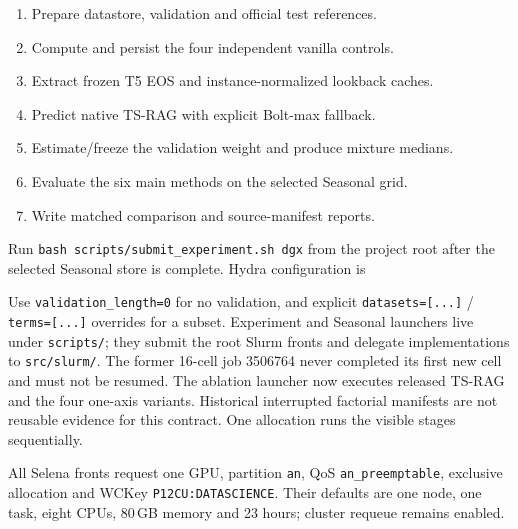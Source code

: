 \documentclass[11pt,a4paper]{article}
\begin{document}
\begin{enumerate}
\item Prepare datastore, validation and official test references.
\item Compute and persist the four independent vanilla controls.
\item Extract frozen T5 EOS and instance-normalized lookback caches.
\item Predict native TS-RAG with explicit Bolt-max fallback.
\item Estimate/freeze the validation weight and produce mixture medians.
\item Evaluate the six main methods on the selected Seasonal grid.
\item Write matched comparison and source-manifest reports.
\end{enumerate}
Run \texttt{bash scripts/submit\_experiment.sh dgx} from the project root after the
selected Seasonal store is complete. Hydra configuration is
\begin{quote}\end{quote}
Use \texttt{validation\_length=0} for no validation, and explicit
\texttt{datasets=[...]} / \texttt{terms=[...]} overrides for a subset.
Experiment and Seasonal launchers live under \texttt{scripts/}; they submit
the root Slurm fronts and delegate implementations to \texttt{src/slurm/}.
The former 16-cell job 3506764 never completed its first new cell and must not
be resumed. The ablation launcher now executes released TS-RAG and the four
one-axis variants. Historical interrupted factorial manifests are not reusable
evidence for this contract.
One allocation runs the visible stages sequentially.

All Selena fronts request one GPU, partition \texttt{an}, QoS
\texttt{an\_preemptable}, exclusive allocation and WCKey
\texttt{P12CU:DATASCIENCE}. Their defaults are one node, one task,
eight CPUs, 80\,GB memory and 23 hours; cluster requeue remains enabled.
\end{document}

